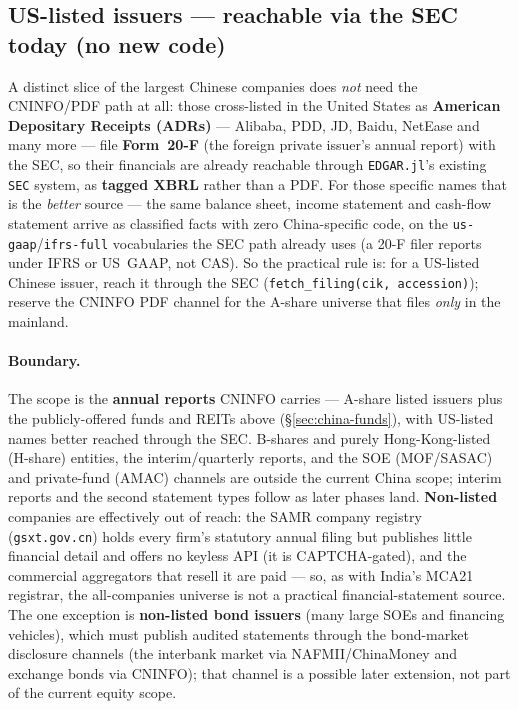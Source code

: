 \documentclass[11pt,a4paper]{report}
\begin{document}
\subsection{US-listed issuers --- reachable via the SEC today (no new code)}\label{sec:china-adr}
A distinct slice of the largest Chinese companies does \emph{not} need the CNINFO/PDF path at all: those
cross-listed in the United States as \textbf{American Depositary Receipts (ADRs)} --- Alibaba, PDD, JD,
Baidu, NetEase and many more --- file \textbf{Form~20-F} (the foreign private issuer's annual report) with
the SEC, so their financials are already reachable through \texttt{EDGAR.jl}'s existing \texttt{SEC} system,
as \textbf{tagged XBRL} rather than a PDF. For those specific names that is the \emph{better} source --- the
same balance sheet, income statement and cash-flow statement arrive as classified facts with zero
China-specific code, on the \texttt{us-gaap}/\texttt{ifrs-full} vocabularies the SEC path already uses (a
20-F filer reports under IFRS or US~GAAP, not CAS). So the practical rule is: for a US-listed Chinese issuer,
reach it through the SEC (\texttt{fetch\_filing(cik, accession)}); reserve the CNINFO PDF channel for the
A-share universe that files \emph{only} in the mainland.

\paragraph{Boundary.} The scope is the \textbf{annual reports} CNINFO carries --- A-share listed issuers plus
the publicly-offered funds and REITs above (\S\ref{sec:china-funds}), with US-listed names better reached
through the SEC. B-shares and purely Hong-Kong-listed (H-share) entities, the interim/quarterly reports, and
the SOE (MOF/SASAC) and private-fund (AMAC) channels are outside the current China scope; interim reports and
the second statement types follow as later phases land. \textbf{Non-listed}
companies are effectively out of reach: the SAMR company registry (\texttt{gsxt.gov.cn}) holds every firm's
statutory annual filing but publishes little financial detail and offers no keyless API (it is CAPTCHA-gated),
and the commercial aggregators that resell it are paid --- so, as with India's MCA21 registrar, the
all-companies universe is not a practical financial-statement source. The one exception is \textbf{non-listed
bond issuers} (many large SOEs and financing vehicles), which must publish audited statements through the
bond-market disclosure channels (the interbank market via NAFMII/ChinaMoney and exchange bonds via CNINFO);
that channel is a possible later extension, not part of the current equity scope.
\end{document}
